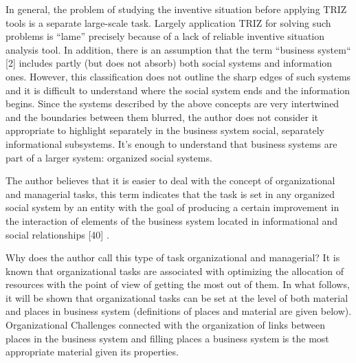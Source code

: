 \documentclass[11pt,a4paper]{book}
\begin{document}
In general, the problem of studying the inventive situation before applying
TRIZ tools is a separate large-scale task. Largely application TRIZ for
solving such problems is “lame” precisely because of a lack of reliable
inventive situation analysis tool.  In addition, there is an assumption that
the term “business system“ [2] includes partly (but does not absorb) both
social systems and information ones.  However, this classification does not
outline the sharp edges of such systems and it is difficult to understand
where the social system ends and the information begins. Since the systems
described by the above concepts are very intertwined and the boundaries
between them blurred, the author does not consider it appropriate to highlight
separately in the business system social, separately informational subsystems.
It’s enough to understand that business systems are part of a larger system:
organized social systems.

The author believes that it is easier to deal with the concept of
organizational and managerial tasks, this term indicates that the task is set
in any organized social system by an entity with the goal of producing a
certain improvement in the interaction of elements of the business system
located in informational and social relationships [40] .

Why does the author call this type of task organizational and managerial?  It
is known that organizational tasks are associated with optimizing the
allocation of resources with the point of view of getting the most out of
them.  In what follows, it will be shown that organizational tasks can be set
at the level of both material and places in business system (definitions of
places and material are given below). Organizational Challenges connected with
the organization of links between places in the business system and filling
places a business system is the most appropriate material given its
properties.
\end{document}
